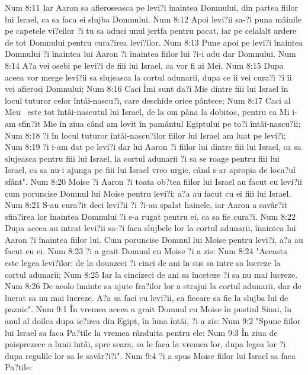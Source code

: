 Num 8:11  Iar Aaron sa afieroseasca pe levi?i înaintea Domnului, din partea fiilor lui Israel, ca sa faca ei slujba Domnului.
Num 8:12  Apoi levi?ii sa-?i puna mâinile pe capetele vi?eilor ?i tu sa aduci unul jertfa pentru pacat, iar pe celalalt ardere de tot Domnului pentru cura?irea levi?ilor.
Num 8:13  Pune apoi pe levi?i înaintea Domnului ?i înaintea lui Aaron ?i înaintea fiilor lui ?i-i adu dar Domnului.
Num 8:14  A?a vei osebi pe levi?i de fiii lui Israel, ca vor fi ai Mei.
Num 8:15  Dupa aceea vor merge levi?ii sa slujeasca la cortul adunarii, dupa ce îi vei cura?i ?i îi vei afierosi Domnului;
Num 8:16  Caci Îmi sunt da?i Mie dintre fiii lui Israel în locul tuturor celor întâi-nascu?i, care deschide orice pântece;
Num 8:17  Caci al Meu  este tot întâi-nascutul lui Israel, de la om pâna la dobitoc, pentru ca Mi i-am sfin?it Mie în ziua când am lovit în pamântul Egiptului pe to?i întâi-nascu?ii;
Num 8:18  ?i în locul tuturor întâi-nascu?ilor fiilor lui Israel am luat pe levi?i;
Num 8:19  ?i i-am dat pe levi?i dar lui Aaron ?i fiilor lui dintre fiii lui Israel, ca sa slujeasca pentru fiii lui Israel, la cortul adunarii ?i sa se roage pentru fiii lui Israel, ca sa nu-i ajunga pe fiii lui Israel vreo urgie, când s-ar apropia de loca?ul sfânt".
Num 8:20  Moise ?i Aaron ?i toata ob?tea fiilor lui Israel au facut cu levi?ii cum poruncise Domnul lui Moise pentru levi?i; a?a au facut cu ei fiii lui Israel.
Num 8:21  S-au cura?it deci levi?ii ?i ?i-au spalat hainele, iar Aaron a savâr?it sfin?irea lor înaintea Domnului ?i s-a rugat pentru ei, ca sa fie cura?i.
Num 8:22  Dupa aceea au intrat levi?ii sa-?i faca slujbele lor la cortul adunarii, înaintea lui Aaron ?i înaintea fiilor lui. Cum poruncise Domnul lui Moise pentru levi?i, a?a au facut cu ei.
Num 8:23  ?i a grait Domnul cu Moise ?i a zis:
Num 8:24  "Aceasta este legea levi?ilor: de la douazeci ?i cinci de ani în sus sa intre sa lucreze la cortul adunarii;
Num 8:25  Iar la cincizeci de ani sa înceteze ?i sa nu mai lucreze.
Num 8:26  De acolo înainte sa ajute fra?ilor lor a strajui la cortul adunarii, dar de lucrat sa nu mai lucreze. A?a sa faci cu levi?ii, ca fiecare sa fie la slujba lui de paznic".
Num 9:1  În vremea aceea a grait Domnul cu Moise în pustiul Sinai, în anul al doilea dupa ie?irea din Egipt, în luna întâi, ?i a zis:
Num 9:2  "Spune fiilor lui Israel sa faca Pa?tile la vremea rânduita pentru ele:
Num 9:3  În ziua de paisprezece a lunii întâi, spre seara, sa le faca la vremea lor, dupa legea lor ?i dupa regulile lor sa le savâr?i?i".
Num 9:4  ?i a spus Moise fiilor lui Israel sa faca Pa?tile:
